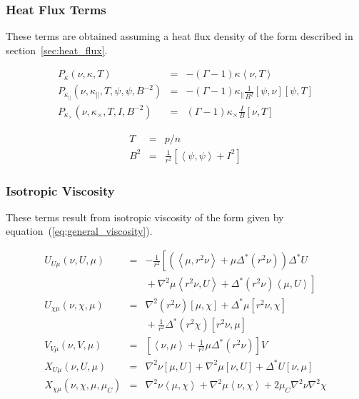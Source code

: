 \documentclass[letterpaper]{book}
\newcommand{\gs}[1]{\Delta^* #1}
\newcommand{\lp}[1]{\nabla^2 #1}
\newcommand{\pb}[2]{\left[#1,#2\right]}
\newcommand{\ip}[2]{\left\langle  #1,#2\right\rangle}
\begin{document}
\subsubsection{Heat Flux Terms}

These terms are obtained assuming a heat flux density of the form
described in section~\ref{sec:heat_flux}.

\begin{equation}
  \begin{array}{lcl}
    P_\kappa(\nu, \kappa, T) & = &
    -(\Gamma - 1) \kappa \ip{\nu}{T}
    \\
    P_{\kappa_\parallel}(\nu, \kappa_\parallel, T, \psi, \psi, B^{-2}) & = &
    -(\Gamma - 1) \kappa_\parallel \frac{1}{B^2} \pb{\psi}{\nu} \pb{\psi}{T}
    \\
    P_{\kappa_\times}(\nu, \kappa_\times, T, I, B^{-2}) & = & 
    (\Gamma - 1) \kappa_\times \frac{I}{B} \pb{\nu}{T}
  \end{array}
\end{equation}

\begin{eqnarray*}
  T & = & p/n \\
  B^2 & = & \frac{1}{r^2} \left[ \ip{\psi}{\psi} + I^2 \right]
\end{eqnarray*}


\subsubsection{Isotropic Viscosity}

These terms result from isotropic viscosity of the form given by
equation~(\ref{eq:general_viscosity}).

\begin{equation}
  \begin{array}{lcl}
    U_{U \mu}(\nu, U, \mu) & = & -\frac{1}{r^2} \left [ \left(
      \ip{\mu}{r^2 \nu} + \mu \gs{(r^2 \nu)} \right) \gs{U} \right. \\
      & & \left. \mbox{} + \lp{\mu} \ip{r^2 \nu}{U} 
      + \gs{(r^2 \nu)} \ip{\mu}{U} \right]
    \\
    U_{\chi \mu}(\nu, \chi, \mu) & = & \lp{(r^2 \nu)} \pb{\mu}{\chi}
      + \gs{\mu}\pb{r^2\nu}{\chi} \\ & & \mbox{}
      + \frac{1}{r^2}\gs{(r^2 \chi)} \pb{r^2 \nu}{\mu}
    \\
    V_{V \mu}(\nu, V, \mu) & = & \left[\ip{\nu}{\mu} 
      + \frac{1}{r^2}\mu \gs{(r^2 \nu)} \right] V
    \\
    X_{U \mu}(\nu, U, \mu) & = & \lp{\nu} \pb{\mu}{U} 
      + \lp{\mu} \pb{\nu}{U} + \gs{U} \pb{\nu}{\mu}
    \\
    X_{\chi \mu}(\nu, \chi, \mu, \mu_C) & = & 
      \lp{\nu} \ip{\mu}{\chi} + \lp{\mu} \ip{\nu}{\chi}
      + 2 \mu_C \lp{\nu} \lp{\chi}
  \end{array}
\end{equation}
\end{document}
